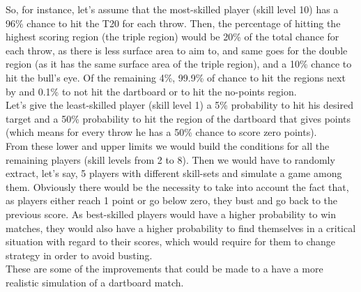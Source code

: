 So, for instance, let's assume that the most-skilled player (skill level 10) has a 96\% chance to hit the T20 for each throw. Then, the percentage of hitting the highest scoring region (the triple region) would be 20\% of the total chance for each throw, as there is less surface area to aim to, and same goes for the double region (as it has the same surface area of the triple region), and a 10\% chance to hit the bull's eye. Of the remaining 4\%, 99.9\% of chance to hit the regions next by and 0.1\% to not hit the dartboard or to hit the no-points region.\\
Let's give the least-skilled player (skill level 1) a 5\% probability to hit his desired target and a 50\% probability to hit the region of the dartboard that gives points (which means for every throw he has a 50\% chance to score zero points).\\
From these lower and upper limits we would build the conditions for all the remaining players (skill levels from 2 to 8). Then we would have to randomly extract, let's say, 5 players with different skill-sets and simulate a game among them.
Obviously there would be the necessity to take into account the fact that, as players either reach 1 point or go below zero, they bust and go back to the previous score. As best-skilled players would have a higher probability to win matches, they would also have a higher probability to find themselves in a critical situation with regard to their scores, which would require for them to change strategy in order to avoid busting.\\
These are some of the improvements that could be made to a have a more realistic simulation of a dartboard match.


